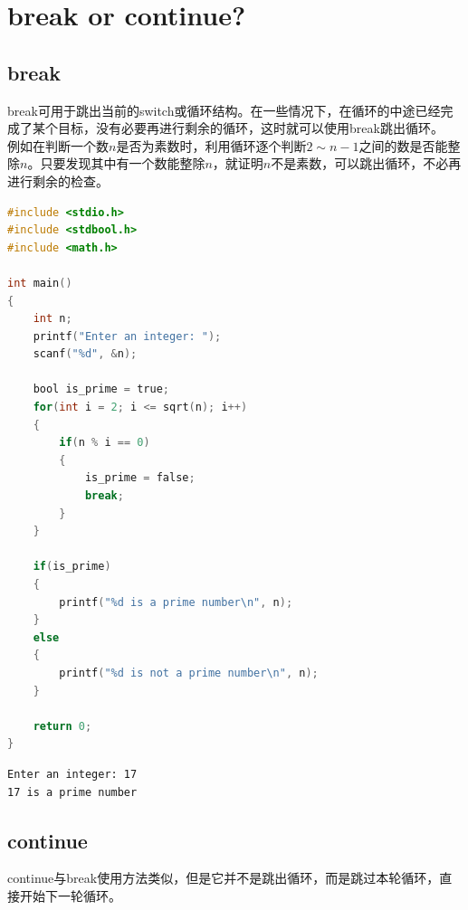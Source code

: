 \newpage

\section{break or continue?}

\subsection{break}

break可用于跳出当前的switch或循环结构。在一些情况下，在循环的中途已经完成了某个目标，没有必要再进行剩余的循环，这时就可以使用break跳出循环。\\

例如在判断一个数$ n $是否为素数时，利用循环逐个判断$ 2 \sim n - 1 $之间的数是否能整除$ n $。只要发现其中有一个数能整除$ n $，就证明$ n $不是素数，可以跳出循环，不必再进行剩余的检查。\\


\begin{lstlisting}[language=C]
#include <stdio.h>
#include <stdbool.h>
#include <math.h>

int main()
{
    int n;
    printf("Enter an integer: ");
    scanf("%d", &n);

    bool is_prime = true;
    for(int i = 2; i <= sqrt(n); i++)
    {
        if(n % i == 0)
        {
            is_prime = false;
            break;
        }
    }

    if(is_prime)
    {
        printf("%d is a prime number\n", n);
    }
    else
    {
        printf("%d is not a prime number\n", n);
    }

    return 0;
}
\end{lstlisting}

\begin{tcolorbox}
    \begin{verbatim}
Enter an integer: 17
17 is a prime number
\end{verbatim}
\end{tcolorbox}

\vspace{0.5cm}

\subsection{continue}

continue与break使用方法类似，但是它并不是跳出循环，而是跳过本轮循环，直接开始下一轮循环。\\

